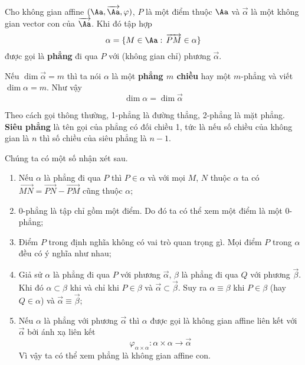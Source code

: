 \begin{definition}[Phẳng]
	Cho không gian affine $(\Aa, \overrightarrow{\Aa}, \varphi)$, $P$ là một điểm thuộc $\Aa$ và $\overrightarrow{\alpha}$ là một không gian vector con của $\overrightarrow{\Aa}$. Khi đó tập hợp 
    \begin{equation*}
        \alpha = \{ M \in \Aa: \, \overrightarrow{PM} \in \alpha\}
    \end{equation*}
    được gọi là \textbf{phẳng} đi qua $P$ với (không gian chỉ) phương $\overrightarrow{\alpha}$.
\end{definition}

Nếu $\dim \overrightarrow{\alpha} = m$ thì ta nói $\alpha$ là một \textbf{phẳng $m$ chiều} hay một $m$-phẳng và viết $\dim \alpha = m$. Như vậy \[\dim \alpha = \dim \overrightarrow{\alpha}\]

Theo cách gọi thông thường, 1-phẳng là đường thẳng, 2-phẳng là mặt phẳng. \textbf{Siêu phẳng} là tên gọi của phẳng có đối chiều 1, tức là nếu số chiều của không gian là $n$ thì số chiều của siêu phẳng là $n-1$.

Chúng ta có một số nhận xét sau.

\begin{enumerate}
	\item Nếu $\alpha$ là phẳng đi qua $P$ thì $P \in \alpha$ và với mọi $M$, $N$ thuộc $\alpha$ ta có $\overrightarrow{MN} = \overrightarrow{PN} - \overrightarrow{PM}$ cũng thuộc $\alpha$;
	\item 0-phẳng là tập chỉ gồm một điểm. Do đó ta có thể xem một điểm là một 0-phẳng;
	\item Điểm $P$ trong định nghĩa không có vai trò quan trọng gì. Mọi điểm $P$ trong $\alpha$ đều có ý nghĩa như nhau;
	\item Giả sử $\alpha$ là phẳng đi qua $P$ với phương $\overrightarrow{\alpha}$, $\beta$ là phẳng đi qua $Q$ với phương $\overrightarrow{\beta}$. Khi đó $\alpha \subset \beta$ khi và chỉ khi $P \in \beta$ và $\overrightarrow{\alpha} \subset \overrightarrow{\beta}$. Suy ra $\alpha \equiv \beta$ khi $P \in \beta$ (hay $Q \in \alpha$) và $\overrightarrow{\alpha} \equiv \overrightarrow{\beta}$;
	\item Nếu $\alpha$ là phẳng với phương $\overrightarrow{\alpha}$ thì $\alpha$ được gọi là không gian affine liên kết với $\overrightarrow{\alpha}$ bởi ánh xạ liên kết
    \begin{equation*}
        \varphi_{\alpha \times \alpha}: \alpha \times \alpha \to \overrightarrow{\alpha}
    \end{equation*}
	Vì vậy ta có thể xem phẳng là không gian affine con.
\end{enumerate}

